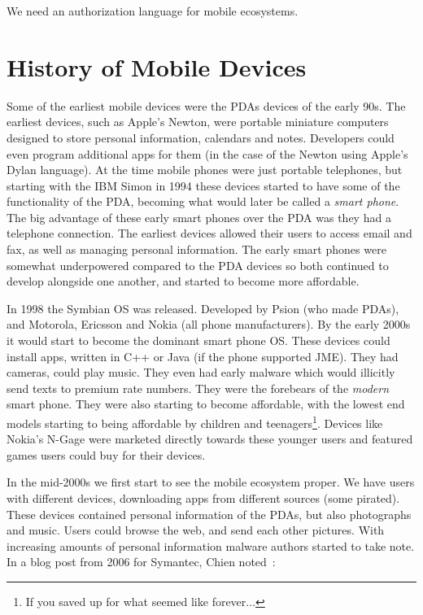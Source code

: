 \documentclass[thesis.tex]{subfiles}
\begin{document}
We need an authorization language for mobile ecosystems.


\section{History of Mobile Devices}

Some of the earliest mobile devices were the \acp{PDA} devices of the
early 90s.  The earliest devices, such as Apple's Newton, were
portable miniature computers designed to store personal information,
calendars and notes.  Developers could even program additional apps
for them (in the case of the Newton using Apple's Dylan language).  At
the time mobile phones were just portable telephones, but starting
with the IBM Simon in 1994 these devices started to have some of the
functionality of the \ac{PDA}, becoming what would later be called a
\emph{smart phone}.  The big advantage of these early smart phones
over the \ac{PDA} was they had a telephone connection.  The earliest
devices allowed their users to access email and fax, as well as
managing personal information.  The early smart phones were somewhat
underpowered compared to the \ac{PDA} devices so both continued to
develop alongside one another, and started to become more affordable.

In 1998 the Symbian OS was released.  Developed by Psion (who made
\acp{PDA}), and Motorola, Ericsson and Nokia (all phone
manufacturers).  By the early 2000s it would start to become the
dominant smart phone OS.  These devices could install apps, written in
C++ or Java (if the phone supported JME). They had cameras, could play
music. They even had early malware which would illicitly send texts to
premium rate numbers.  They were the forebears of the \emph{modern}
smart phone.
They were also starting to become affordable, with the lowest end
models starting to being affordable by children and
teenagers\footnote{If you saved up for what seemed like
  forever$\ldots$}.  Devices like Nokia's N-Gage were marketed directly
towards these younger users and featured games users could buy for
their devices.

In the mid-2000s we first start to see the mobile
ecosystem proper.  We have users with different devices, downloading
apps from different sources (some pirated).  These devices
contained personal information of the \acp{PDA}, but also photographs
and music.  Users could browse the web, and send each other pictures.
With increasing amounts of personal information malware authors
started to take note.  In a blog post from 2006 for Symantec, Chien
noted~\cite{eric_chien_spyware_2006}:
\end{document}
